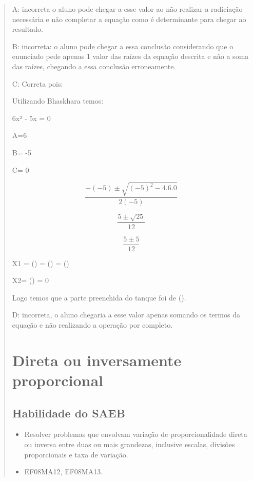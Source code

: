 \begin{quote}
\begin{escolha}
A: incorreta o aluno pode chegar a esse valor ao não realizar a
radiciação necessária e não completar a equação como é determinante para
chegar ao resultado.

B: incorreta: o aluno pode chegar a essa conclusão considerando que o
enunciado pede apenas 1 valor das raízes da equação descrita e não a
soma das raízes, chegando a essa conclusão erroneamente.

C: Correta pois:

Utilizando Bhaskhara temos:

6x² - 5x = 0

A=6

B= -5

C= 0

\[\frac{- ( - 5) \pm \sqrt{{( - 5)}^{2} - 4.6.0}}{2( - 5)}\]

\[\frac{5 \pm \sqrt{25}}{12}\]

\[\frac{5 \pm 5}{12}\]

X1 = () = () = ()

X2= () = 0

Logo temos que a parte preenchida do tanque foi de ().

D: incorreta, o aluno chegaria a esse valor apenas somando os termos da
equação e não realizando a operação por completo.

\chapter{Direta ou inversamente proporcional}

\section{Habilidade do SAEB}

\begin{itemize}
\item
  Resolver problemas que envolvam variação de proporcionalidade direta
  ou inversa entre duas ou mais grandezas, inclusive escalas, divisões
  proporcionais e taxa de variação.
\end{itemize}


\begin{itemize}
\item EF08MA12, EF08MA13.
\end{itemize}

\end{escolha}
\end{quote}
